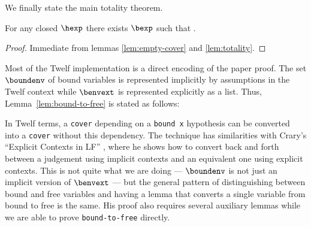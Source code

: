 We finally state the main totality theorem.

\begin{theorem}
For any closed $\hexp$ there exists $\bexp$ such that \trahb{\envnil}{\envnil}{\bexp}{\hexp}.
\end{theorem}


\begin{proof}
Immediate from lemmas \ref{lem:empty-cover} and \ref{lem:totality}.
\end{proof}

\Twelf
Most of the Twelf implementation is a direct encoding of the paper proof.
The set $\boundenv$ of bound variables is represented implicitly by assumptions in the Twelf context while $\benvext$ is represented explicitly as a list.
Thus, Lemma~\ref{lem:bound-to-free} is stated as follows:

In Twelf terms, a \texttt{cover} depending on a \texttt{bound x} hypothesis can be converted into a \texttt{cover} without this dependency.
The technique has similarities with Crary's ``Explicit Contexts in LF'' \cite{Crary08}, where he shows how to convert back and forth between a judgement using implicit contexts and an equivalent one using explicit contexts.
This is not quite what we are doing --- $\boundenv$ is not just an implicit version of $\benvext$ --- but the general pattern of distinguishing between bound and free variables and having a lemma that converts a single variable from bound to free is the same.
His proof also requires several auxiliary lemmas while we are able to prove \texttt{bound-to-free} directly.

